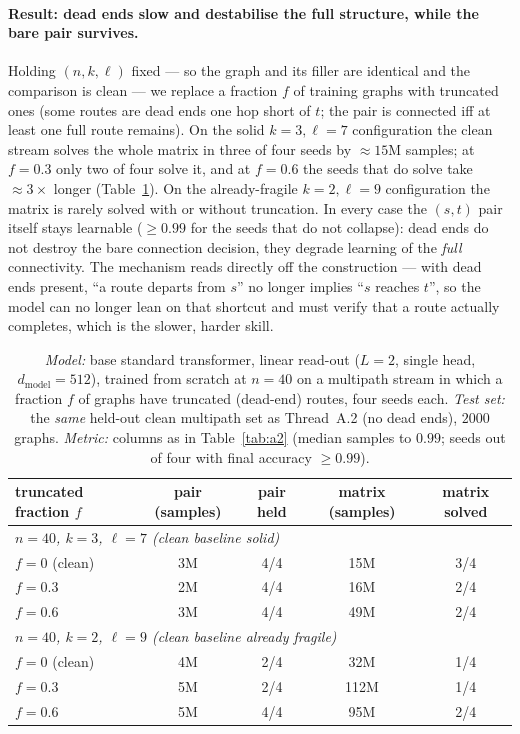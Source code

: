 \documentclass[11pt,a4paper]{article}
\begin{document}
\paragraph{Result: dead ends slow and destabilise the full structure, while the bare pair survives.}
Holding $(n,k,\ell)$ fixed --- so the graph and its filler are identical and the comparison is
clean --- we replace a fraction $f$ of training graphs with truncated ones (some routes are dead
ends one hop short of $t$; the pair is connected iff at least one full route remains). On the solid
$k=3,\ell=7$ configuration the clean stream solves the whole matrix in three of four seeds by
$\approx15$M samples; at $f=0.3$ only two of four solve it, and at $f=0.6$ the seeds that do solve
take $\approx3\times$ longer (Table~\ref{tab:a3}). On the already-fragile
$k=2,\ell=9$ configuration the matrix is rarely solved with or without truncation. In every case the
$(s,t)$ pair itself stays learnable ($\ge0.99$ for the seeds that do not collapse): dead ends do not
destroy the bare connection decision, they degrade learning of the \emph{full} connectivity. The
mechanism reads directly off the construction --- with dead ends present, ``a route departs from
$s$'' no longer implies ``$s$ reaches $t$'', so the model can no longer lean on that shortcut and
must verify that a route actually completes, which is the slower, harder skill.

\begin{table}[H]\centering\small
\begin{tabular}{lcccc}
\toprule
truncated fraction $f$ & pair (samples) & pair held & matrix (samples) & matrix solved\\
\midrule
\multicolumn{5}{l}{\emph{$n=40$, $k=3$, $\ell=7$ (clean baseline solid)}}\\
$f=0$ (clean) & 3M & 4/4 & 15M & 3/4\\
$f=0.3$       & 2M & 4/4 & 16M & 2/4\\
$f=0.6$       & 3M & 4/4 & 49M & 2/4\\
\multicolumn{5}{l}{\emph{$n=40$, $k=2$, $\ell=9$ (clean baseline already fragile)}}\\
$f=0$ (clean) & 4M & 2/4 & 32M  & 1/4\\
$f=0.3$       & 5M & 2/4 & 112M & 1/4\\
$f=0.6$       & 5M & 4/4 & 95M  & 2/4\\
\bottomrule\end{tabular}
\caption{\emph{Model:} base standard transformer, linear read-out ($L=2$, single head,
$d_{\mathrm{model}}=512$), trained from scratch at $n=40$ on a multipath stream in which a fraction
$f$ of graphs have truncated (dead-end) routes, four seeds each. \emph{Test set:} the \emph{same}
held-out clean multipath set as Thread~A.2 (no dead ends), $2000$ graphs. \emph{Metric:} columns as
in Table~\ref{tab:a2} (median samples to $0.99$; seeds out of four with final accuracy $\ge0.99$).}
\label{tab:a3}
\end{table}
\end{document}
